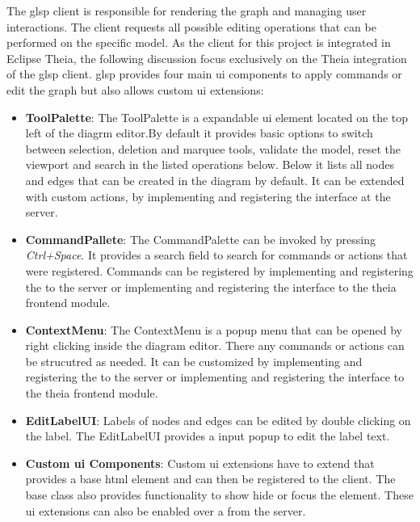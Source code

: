   The \ac{glsp} client is responsible for rendering the graph and managing user interactions. The client requests all possible editing operations that can be performed on the specific model.  As the client for this project is integrated in Eclipse Theia, the following discussion focus exclusively on the Theia integration of the \ac{glsp} client. \cite{glsp-doc} \ac{glsp} provides four main \acs{ui} components to apply commands or edit the graph but also allows custom \ac{ui} extensions: 

  \begin{itemize}
    \item \textbf{ToolPalette}: The ToolPalette is a expandable \ac{ui} element located on the top left of the diagrm editor.By default it provides basic options to switch between selection, deletion and marquee tools, validate the model, reset the viewport and search in the listed operations below. Below it lists all nodes and edges that can be created in the diagram by default. It can be extended with custom actions, by implementing and registering the  interface at the server. \cite{glsp-doc,glsp-repo} 
    \item \textbf{CommandPallete}: The CommandPalette can be invoked by pressing \textit{Ctrl+Space}. It provides a search field to search for commands or actions that were registered. Commands can be registered by implementing and registering the  to the server or implementing and registering the  interface to the theia frontend module. \cite{glsp-doc,glsp-repo} 
    \item \textbf{ContextMenu}: The ContextMenu is a popup menu that can be opened by right clicking inside the diagram editor. There any commands or actions can be strucutred as needed. It can be customized by implementing and registering the  to the server or implementing and registering the  interface to the theia frontend module. \cite{glsp-doc,glsp-repo} 
    \item \textbf{EditLabelUI}: Labels of nodes and edges can be edited by double clicking on the label. The EditLabelUI provides a input popup to edit the label text. \cite{glsp-doc,glsp-repo}
    \item \textbf{Custom \acs{ui} Components}: Custom \acs{ui} extensions have to extend  that provides a base \acs{html} element and can then be registered to the client. The base class also provides functionality to show hide or focus the element. These \acs{ui} extensions can also be enabled over a  from the server. \cite{glsp-doc,glsp-repo}
  \end{itemize}

